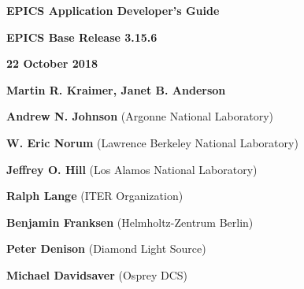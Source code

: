 \def\divider{\par
  \vskip 0.5in
  \hrulefill
  \vskip 0.5in
}

\divider

\Huge \textbf{EPICS Application Developer's Guide}

\vskip 0.5in

\Large \textbf{EPICS Base Release 3.15.6}

\textbf{22 October 2018}

\vskip 0.5in

\normalsize
\textbf{Martin R. Kraimer, Janet B. Anderson}

\textbf{Andrew N. Johnson} (Argonne National Laboratory)

\textbf{W. Eric Norum} (Lawrence Berkeley National Laboratory)

\textbf{Jeffrey O. Hill} (Los Alamos National Laboratory)

\textbf{Ralph Lange} (ITER Organization)

\textbf{Benjamin Franksen} (Helmholtz-Zentrum Berlin)

\textbf{Peter Denison} (Diamond Light Source)

\textbf{Michael Davidsaver} (Osprey DCS)

\divider
